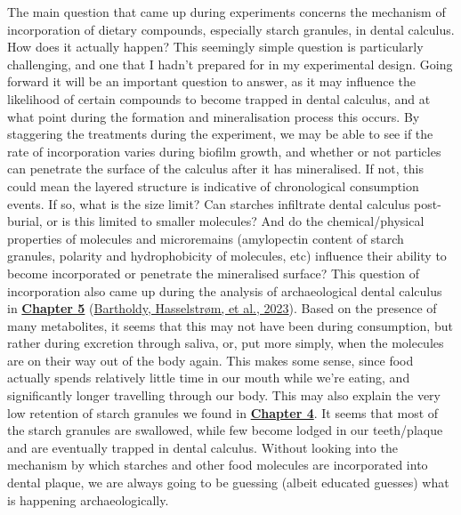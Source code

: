 \documentclass[
  b5paper,
]{book}
\begin{document}
The main question that came up during experiments concerns the mechanism
of incorporation of dietary compounds, especially starch granules, in
dental calculus. How does it actually happen? This seemingly simple
question is particularly challenging, and one that I hadn't prepared for
in my experimental design. Going forward it will be an important
question to answer, as it may influence the likelihood of certain
compounds to become trapped in dental calculus, and at what point during
the formation and mineralisation process this occurs. By staggering the
treatments during the experiment, we may be able to see if the rate of
incorporation varies during biofilm growth, and whether or not particles
can penetrate the surface of the calculus after it has mineralised. If
not, this could mean the layered structure is indicative of
chronological consumption events. If so, what is the size limit? Can
starches infiltrate dental calculus post-burial, or is this limited to
smaller molecules? And do the chemical/physical properties of molecules
and microremains (amylopectin content of starch granules, polarity and
hydrophobicity of molecules, etc) influence their ability to become
incorporated or penetrate the mineralised surface? This question of
incorporation also came up during the analysis of archaeological dental
calculus in \protect\hyperlink{mb11CalculusPilot}{\textbf{Chapter 5}}
(\protect\hyperlink{ref-bartholdyMultiproxyAnalysis2023}{Bartholdy,
Hasselstrøm, et al., 2023}). Based on the presence of many metabolites,
it seems that this may not have been during consumption, but rather
during excretion through saliva, or, put more simply, when the molecules
are on their way out of the body again. This makes some sense, since
food actually spends relatively little time in our mouth while we're
eating, and significantly longer travelling through our body. This may
also explain the very low retention of starch granules we found in
\protect\hyperlink{byoc-starch}{\textbf{Chapter 4}}. It seems that most
of the starch granules are swallowed, while few become lodged in our
teeth/plaque and are eventually trapped in dental calculus. Without
looking into the mechanism by which starches and other food molecules
are incorporated into dental plaque, we are always going to be guessing
(albeit educated guesses) what is happening archaeologically.
\end{document}
